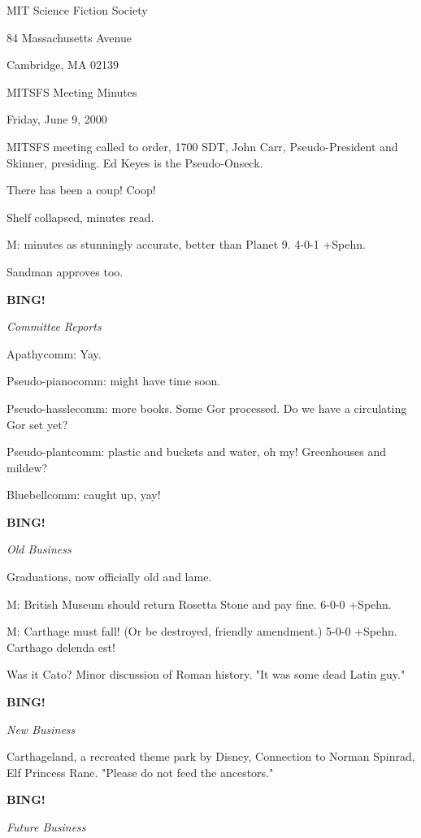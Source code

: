 \documentclass[12pt]{article}
\newcommand{\bing}{{\bf BING!} }
\newcommand{\goto}[1]{\bing \vskip 12pt \centerline{{\em{#1}}}}
\begin{document}
\begin{center}

MIT Science Fiction Society 

84 Massachusetts Avenue

Cambridge, MA 02139

\vspace{12pt}

MITSFS Meeting Minutes 

Friday, June 9, 2000

\end{center}
 
\vspace{18pt}

\setlength{\parskip}{6pt}

\noindent
MITSFS meeting called to order, 1700 SDT, John Carr, Pseudo-President and
Skinner, presiding.  Ed Keyes is the Pseudo-Onseck.

There has been a coup! Coop!

Shelf collapsed, minutes read.

M: minutes as stunningly accurate, better than Planet 9. 4-0-1 +Spehn.

Sandman approves too.

\goto{Committee Reports}

Apathycomm: Yay.

Pseudo-pianocomm: might have time soon.

Pseudo-hasslecomm: more books. Some Gor processed. Do we have a circulating Gor set yet?

Pseudo-plantcomm: plastic and buckets and water, oh my! Greenhouses and mildew?

Bluebellcomm: caught up, yay!

\goto{Old Business}

Graduations, now officially old and lame.

M: British Museum should return Rosetta Stone and pay fine. 6-0-0 +Spehn.

M: Carthage must fall! (Or be destroyed, friendly amendment.) 5-0-0 +Spehn. Carthago delenda est!

Was it Cato? Minor discussion of Roman history. "It was some dead Latin guy."

\goto{New Business}

Carthageland, a recreated theme park by Disney, Connection to Norman Spinrad, Elf Princess Rane. "Please do not feed the ancestors."

\goto{Future Business}
\end{document}
